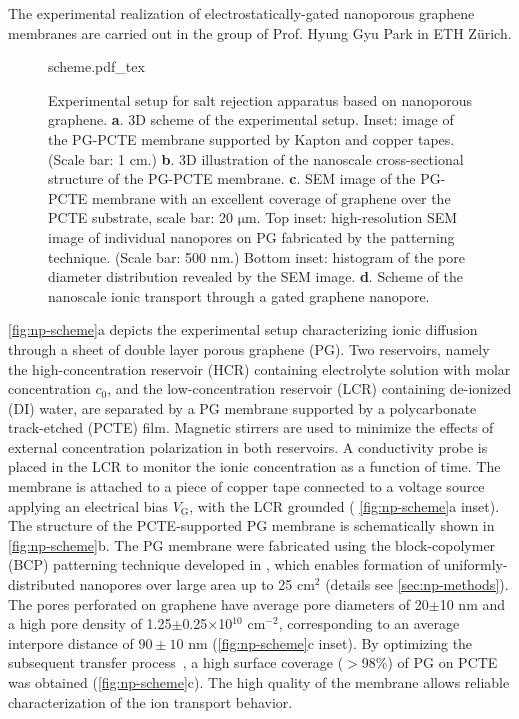 The experimental realization of electrostatically-gated nanoporous
graphene membranes are carried out in the group of Prof. Hyung Gyu
Park in ETH Zürich.

\begin{figure}[!htbp]
  \centering
  {scheme.pdf_tex}
  \caption{Experimental setup for salt rejection apparatus based on
    nanoporous graphene.  \textbf{a}. 3D scheme of the experimental
    setup. Inset: image of the PG-PCTE membrane supported by Kapton
    and copper tapes. (Scale bar: 1 cm.)  \textbf{b}. 3D illustration
    of the nanoscale cross-sectional structure of the PG-PCTE
    membrane. \textbf{c}. SEM image of the PG-PCTE membrane with an
    excellent coverage of graphene over the PCTE substrate, scale bar:
    20 $\mathrm{\mu}$m.  Top inset: high-resolution SEM image of
    individual nanopores on PG fabricated by the patterning
    technique. (Scale bar: 500 nm.)  Bottom inset: histogram of
    the pore diameter distribution revealed by the SEM
    image. \textbf{d}. Scheme of the nanoscale ionic transport
    through a gated graphene nanopore.}
  \label{fig:np-scheme}
\end{figure}

%
 \autoref{fig:np-scheme}a depicts the experimental setup characterizing
ionic diffusion through a sheet of double layer porous graphene
(PG).
%
Two reservoirs, namely the high-concentration reservoir (HCR)
containing electrolyte solution with molar concentration $c_0$, and
the low-concentration reservoir (LCR) containing de-ionized (DI)
water, are separated by a PG membrane supported by a polycarbonate
track-etched (PCTE) film.
%
Magnetic stirrers are used to minimize the effects of external
concentration polarization in both reservoirs.
%
A conductivity
probe is placed in the LCR to monitor the ionic concentration as a
function of time. The membrane is attached to a piece of copper tape
connected to a voltage source applying an electrical bias
$V_{\mathrm{G}}$, with the LCR grounded ( \autoref{fig:np-scheme}a
inset).
%
The structure of the PCTE-supported PG membrane is schematically shown
in \autoref{fig:np-scheme}b. The PG membrane were fabricated using the
block-copolymer (BCP) patterning technique developed in
\cite{Choi_2018_wafer_scale_gr}, which enables formation of
uniformly-distributed nanopores over large area up to 25 cm$^{2}$
(details see \autoref{sec:np-methods}).
%
The pores perforated on graphene have average pore diameters of
20$\pm$10 nm and a high pore density of 1.25$\pm$0.25$\times$10$^{10}$
cm$^{-2}$, corresponding to an average inter\-pore distance of
$90\pm10$ nm  (\autoref{fig:np-scheme}c inset).
%
By optimizing the subsequent transfer
process~\cite{Choi_2018_wafer_scale_gr}, a high surface coverage
($>$98\%) of PG on PCTE was obtained (\autoref{fig:np-scheme}c).
The high quality of the membrane allows
reliable characterization of the ion transport behavior.
%


